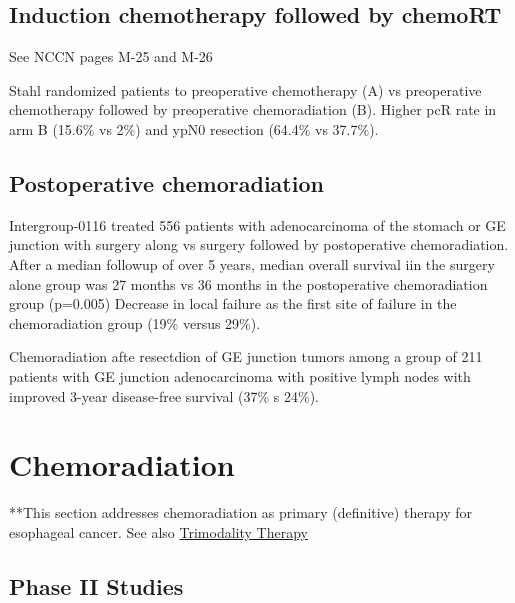 \documentclass[
]{book}
\begin{document}
\citep{siewert260}

\hypertarget{induction-chemotherapy-followed-by-chemort}{%
\section{Induction chemotherapy followed by chemoRT}\label{induction-chemotherapy-followed-by-chemort}}

See NCCN pages M-25 and M-26

Stahl \citep{stahl851} randomized patients to preoperative chemotherapy (A) vs preoperative chemotherapy followed by preoperative chemoradiation (B). Higher pcR rate in arm B (15.6\% vs 2\%) and ypN0 resection (64.4\% vs 37.7\%).

\hypertarget{postoperative-chemoradiation}{%
\section{Postoperative chemoradiation}\label{postoperative-chemoradiation}}

Intergroup-0116 \citep{macdonald725} \citep{smalley2327} treated 556 patients with adenocarcinoma of the stomach or GE junction with surgery along vs surgery followed by postoperative chemoradiation. After a median followup of over 5 years, median overall survival iin the surgery alone group was 27 months vs 36 months in the postoperative chemoradiation group (p=0.005) Decrease in local failure as the first site of failure in the chemoradiation group (19\% versus 29\%).

Chemoradiation afte resectdion of GE junction tumors \citep{kofoed26} among a group of 211 patients with GE junction adenocarcinoma with positive lymph nodes with improved 3-year disease-free survival (37\% s 24\%).

\hypertarget{eso_dcrt}{%
\chapter{Chemoradiation}\label{eso_dcrt}}

**This section addresses chemoradiation as primary (definitive) therapy for esophageal cancer. See also \protect\hyperlink{trimodality}{Trimodality Therapy}

\hypertarget{phase-ii-studies}{%
\section{Phase II Studies}\label{phase-ii-studies}}
\end{document}
